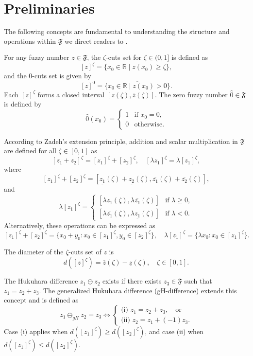 \documentclass[10pt,a4paper]{amsart}
\numberwithin{equation}{section}
\begin{document}
\section{Preliminaries}

 The following concepts are fundamental to understanding the structure and
 operations within $\mathfrak{F}$ we direct readers to \cite{bed}.
 
For any fuzzy number \( z \in \mathfrak{F} \), the \(\zeta\)-cuts set for
\(\zeta \in (0,1]\) is defined as
 \[
 [z]^\zeta = \{ x_0 \in \mathbb{R} \mid z(x_0) \geq \zeta \},
 \]
and the 0-cuts set is given by
\[
 [z]^0 = \overline{\{ x_0 \in \mathbb{R} \mid z(x_0) > 0 \}}.
\]
Each \([z]^\zeta\) forms a closed interval \([\underline{z}(\zeta), \overline{z}(\zeta)]\). The zero fuzzy number \(\hat{0} \in \mathfrak{F}\) is defined by
\[
 \hat{0}(x_0) = \begin{cases}
 1 & \text{if } x_0 = 0, \\
 0 & \text{otherwise}.
 \end{cases}
\]

According to Zadeh's extension principle, addition and scalar multiplication 
in $\mathfrak{F}$ are defined for all $\zeta \in [0,1]$ as
\[
 [z_1 + z_2]^\zeta = [z_1]^\zeta + [z_2]^\zeta, \quad 
 [\lambda z_1]^\zeta = \lambda [z_1]^\zeta,
\]
 where
\[
 [z_1]^\zeta + [z_2]^\zeta = [\underline{z_1}(\zeta) + \underline{z_2}(\zeta), \overline{z_1}(\zeta) + \overline{z_2}(\zeta)],
 \]
and
\begin{equation} \label{eq21}
 \lambda [z_1]^\zeta = \begin{cases}
 [\lambda \underline{z_1}(\zeta), \lambda \overline{z_1}(\zeta)]
 & \text{if }   \lambda \geq 0, \\
 [\lambda \overline{z_1}(\zeta), \lambda \underline{z_1}(\zeta)]
 & \text{if } \lambda < 0.
 \end{cases}
\end{equation}
 Alternatively, these operations can be expressed as
\[
 [z_1]^\zeta + [z_2]^\zeta = \{x_0 + y_0 : x_0 \in [z_1]^\zeta, y_0 \in [z_2]^\zeta\},
 \quad \lambda [z_1]^\zeta = \{\lambda x_0 : x_0 \in [z_1]^\zeta\}.
\]

 The diameter of the \(\zeta\)-cuts set of \(z\) is
 \[
 d([z]^\zeta) = \overline{z}(\zeta) - \underline{z}(\zeta), \quad \zeta \in [0,1].
 \]

The Hukuhara difference \(z_1 \ominus z_2\) exists if there exists
 \(z_3 \in \mathfrak{F}\) such that \(z_1 = z_2 + z_3\).
The generalized Hukuhara difference (gH-difference) extends this 
concept and is defined as
 \[\label{eq22}
 z_1 \ominus_{gH} z_2 = z_3 \Leftrightarrow
 \begin{cases}
 \text{(i) } z_1 = z_2 + z_3, \quad \text{or} \\
 \text{(ii) } z_2 = z_1 + (-1)z_3.
 \end{cases}\tag{2.2}
 \]
Case (i) applies when \(d([z_1]^\zeta) \geq d([z_2]^\zeta)\), and case (ii) when 
\(d([z_1]^\zeta) \leq d([z_2]^\zeta)\).
\end{document}
